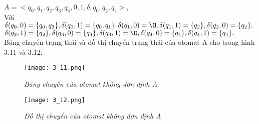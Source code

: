 \begin{flushleft}
$A = <{q_0, q_1, q_2, q_3, q_4}, {0, 1}, \delta, q_0, {q_2, q_4}>,$\\
Với $\delta(q_0,0) = \{q_0,q_3\},\delta(q_0, 1) = \{q_0,q_1\}, \delta(q_1, 0) = \O, \delta(q_1, 1) = \{q_2\}, \delta(q_2, 0) = \{q_2\},$\\
$\delta(q_2, 1) = \{q_2\}, \delta(q_3, 0) = \{q_4\}, \delta(q_3,1) = \O, \delta(q_4, 0) = \{q_4\}, \delta(q_4, 1) = \{q_4\}.$\\
Bảng chuyển trạng thái và đồ thị chuyển trạng thái của otomat A cho trong hình 3.11 và 3.12:\\
\begin{figure}[ht]
\texttt{[image: 3\_11.png]}
\caption{ \textit{Bảng chuyển của otomat không đơn định A}}
\end{figure}
\begin{figure}[ht]
\texttt{[image: 3\_12.png]}
\caption{ \textit{Đồ thị chuyển của otomat không đơn định A}}
\end{figure}


\end{flushleft}
